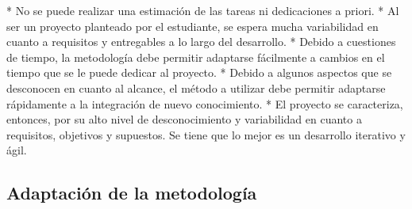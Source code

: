 \begin{markdown}
* No se puede realizar una estimación de las tareas ni dedicaciones a priori.
* Al ser un proyecto planteado por el estudiante, se espera mucha variabilidad
en cuanto a requisitos y entregables a lo largo del desarrollo.
* Debido a cuestiones de tiempo, la metodología debe permitir adaptarse
fácilmente a cambios en el tiempo que se le puede dedicar al proyecto.
* Debido a algunos aspectos que se desconocen en cuanto al alcance, el método a
utilizar debe permitir adaptarse rápidamente a la integración de nuevo
conocimiento.
* El proyecto se caracteriza, entonces, por su alto nivel de desconocimiento y
variabilidad en cuanto a requisitos, objetivos y supuestos. Se tiene que lo
mejor es un desarrollo iterativo y ágil.

\end{markdown}



\subsection{Adaptación de la metodología}\label{subsec:kanban_adaptacion}

